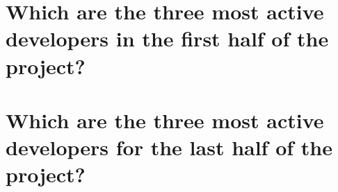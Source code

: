 \section*{Which are the three most active developers in the first half of the project?}
\section*{Which are the three most active developers for the last half of the project?}

